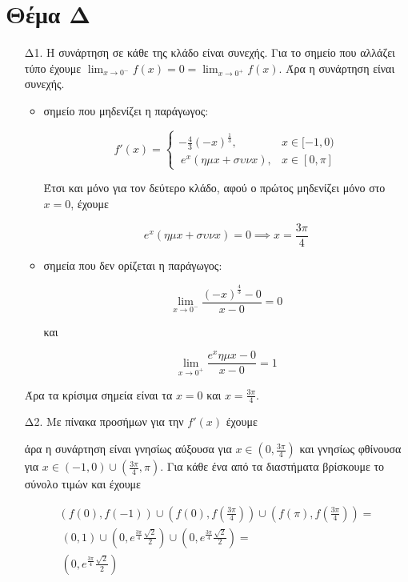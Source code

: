 \documentclass[12pt]{article}
\begin{document}
    \section*{Θέμα Δ}
      \begin{enumerate}
        \item [Δ1.] Η συνάρτηση σε κάθε της κλάδο είναι συνεχής. Για το σημείο που αλλάζει τύπο έχουμε $\lim_{x\to 0^-}f(x)=0=\lim_{x\to 0^+}f(x)$. Άρα η συνάρτηση είναι συνεχής.

          \begin{itemize}
            \item σημείο που μηδενίζει η παράγωγος:

              $$f'(x)=\begin{cases} -\frac{4}{3}\left(-x\right)^{\frac{1}{3}}, & x\in[-1,0) \\\ e^x(ημx+συνx), & x\in[0,\pi]\end{cases}$$

              Έτσι και μόνο για τον δεύτερο κλάδο, αφού ο πρώτος μηδενίζει μόνο στο $x=0$, έχουμε

              $$e^x(ημx+συνx)=0\implies x=\frac{3\pi}{4}$$

            \item σημεία που δεν ορίζεται η παράγωγος:

              $$\lim_{x\to 0^-}\frac{(-x)^{\frac{4}{3}}-0}{x-0}=0$$

              και

              $$\lim_{x\to 0^+}\frac{e^xημx-0}{x-0}=1$$
          \end{itemize}

Άρα τα κρίσιμα σημεία είναι τα $x=0$ και $x=\frac{3\pi}{4}$.


  \item [Δ2.] Με πίνακα προσήμων για την $f'(x)$ έχουμε

    άρα η συνάρτηση είναι γνησίως αύξουσα για $x\in(0,\frac{3\pi}{4})$ και γνησίως φθίνουσα για $x\in(-1,0)\cup(\frac{3\pi}{4},\pi)$. Για κάθε ένα από τα διαστήματα βρίσκουμε το σύνολο τιμών και έχουμε

    \begin{equation*}
      \begin{split}
        \left(f(0),f(-1)\right)\cup\left(f(0),f(\frac{3\pi}{4})\right)\cup\left(f(\pi),f(\frac{3\pi}{4})\right)= \\\ \left(0,1\right)\cup\left(0,e^{\frac{3\pi}{4}}\frac{\sqrt{2}}{2}\right)\cup\left(0,e^{\frac{3\pi}{4}}\frac{\sqrt{2}}{2}\right)= \\\
        \left(0,e^{\frac{3\pi}{4}}\frac{\sqrt{2}}{2}\right)
      \end{split}
    \end{equation*}


\end{enumerate}
\end{document}
